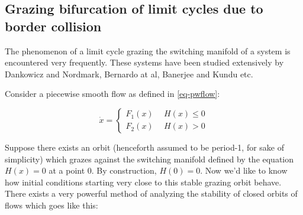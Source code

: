 \documentclass{book}
\renewcommand{\(}{\begin{columns}}
\renewcommand{\)}{\end{columns}}
\newcommand{\<}[1]{\begin{column}{#1}}
\renewcommand{\>}{\end{column}}
\begin{document}
\subsection{Grazing bifurcation of limit cycles due to border collision}
The phenomenon of a limit cycle grazing the switching manifold of a system is encountered 
very frequently.  These systems have been studied extensively by Dankowicz and Nordmark\cite{dankowicz-nordmark-zdm}, Bernardo at al\cite{bernardo-grazing-prl}, Banerjee and Kundu\cite{banerjee-kundu-soft} etc.


Consider a piecewise smooth flow as defined in \eqref{eq-pwflow}:

\begin{equation}
\dot{x}=
\begin{cases}
F_1(x)&~~H(x)\le 0\\
F_2(x)&~~H(x)> 0
\end{cases}
\end{equation}

Suppose there exists an orbit (henceforth assumed to be period-1, for sake of 
simplicity)  which grazes against the switching manifold defined by the 
equation $H(x)=0$ at a point $0$.  By construction, $H(0)=0$.  Now we'd like 
to know how initial conditions starting very close to this stable grazing 
orbit behave.  There exists a very powerful method of analyzing the stability 
of closed orbits of flows which goes like this:
\end{document}
